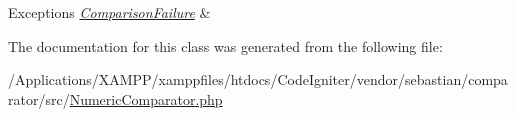 \begin{DoxyExceptions}{Exceptions}
{\em \mbox{\hyperlink{class_sebastian_bergmann_1_1_comparator_1_1_comparison_failure}{Comparison\+Failure}}} & \\
\hline
\end{DoxyExceptions}


The documentation for this class was generated from the following file\+:\begin{DoxyCompactItemize}
\item 
/\+Applications/\+X\+A\+M\+P\+P/xamppfiles/htdocs/\+Code\+Igniter/vendor/sebastian/comparator/src/\mbox{\hyperlink{_numeric_comparator_8php}{Numeric\+Comparator.\+php}}\end{DoxyCompactItemize}
